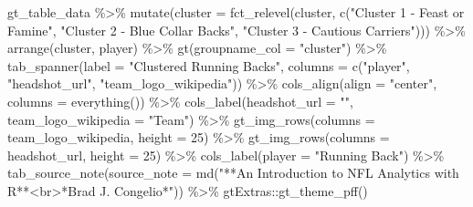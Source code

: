 \documentclass[
  letterpaper,
]{krantz}
\newenvironment{Shaded}{\begin{snugshade}}{\end{snugshade}}
\newcommand{\AttributeTok}[1]{\textcolor[rgb]{0.40,0.45,0.13}{#1}}
\newcommand{\DecValTok}[1]{\textcolor[rgb]{0.68,0.00,0.00}{#1}}
\newcommand{\FunctionTok}[1]{\textcolor[rgb]{0.28,0.35,0.67}{#1}}
\newcommand{\NormalTok}[1]{\textcolor[rgb]{0.00,0.23,0.31}{#1}}
\newcommand{\SpecialCharTok}[1]{\textcolor[rgb]{0.37,0.37,0.37}{#1}}
\newcommand{\StringTok}[1]{\textcolor[rgb]{0.13,0.47,0.30}{#1}}
\begin{document}
\begin{Shaded}
\begin{Highlighting}[]
\NormalTok{gt\_table\_data }\SpecialCharTok{\%\textgreater{}\%}
  \FunctionTok{mutate}\NormalTok{(}\AttributeTok{cluster =} \FunctionTok{fct\_relevel}\NormalTok{(cluster,}
                               \FunctionTok{c}\NormalTok{(}\StringTok{"Cluster 1 {-} Feast or Famine"}\NormalTok{,}
                                 \StringTok{"Cluster 2 {-} Blue Collar Backs"}\NormalTok{,}
                                 \StringTok{"Cluster 3 {-} Cautious Carriers"}\NormalTok{))) }\SpecialCharTok{\%\textgreater{}\%}
  \FunctionTok{arrange}\NormalTok{(cluster, player) }\SpecialCharTok{\%\textgreater{}\%}
  \FunctionTok{gt}\NormalTok{(}\AttributeTok{groupname\_col =} \StringTok{"cluster"}\NormalTok{) }\SpecialCharTok{\%\textgreater{}\%}
  \FunctionTok{tab\_spanner}\NormalTok{(}\AttributeTok{label =} \StringTok{"Clustered Running Backs"}\NormalTok{,}
              \AttributeTok{columns =} \FunctionTok{c}\NormalTok{(}\StringTok{"player"}\NormalTok{, }\StringTok{"headshot\_url"}\NormalTok{,}
                          \StringTok{"team\_logo\_wikipedia"}\NormalTok{)) }\SpecialCharTok{\%\textgreater{}\%}
  \FunctionTok{cols\_align}\NormalTok{(}\AttributeTok{align =} \StringTok{"center"}\NormalTok{,}
             \AttributeTok{columns =} \FunctionTok{everything}\NormalTok{()) }\SpecialCharTok{\%\textgreater{}\%}
  \FunctionTok{cols\_label}\NormalTok{(}\AttributeTok{headshot\_url =} \StringTok{""}\NormalTok{, }\AttributeTok{team\_logo\_wikipedia =} \StringTok{"Team"}\NormalTok{) }\SpecialCharTok{\%\textgreater{}\%}
  \FunctionTok{gt\_img\_rows}\NormalTok{(}\AttributeTok{columns =}\NormalTok{ team\_logo\_wikipedia, }\AttributeTok{height =} \DecValTok{25}\NormalTok{) }\SpecialCharTok{\%\textgreater{}\%}
  \FunctionTok{gt\_img\_rows}\NormalTok{(}\AttributeTok{columns =}\NormalTok{ headshot\_url, }\AttributeTok{height =} \DecValTok{25}\NormalTok{) }\SpecialCharTok{\%\textgreater{}\%}
  \FunctionTok{cols\_label}\NormalTok{(}\AttributeTok{player =} \StringTok{"Running Back"}\NormalTok{) }\SpecialCharTok{\%\textgreater{}\%}
  \FunctionTok{tab\_source\_note}\NormalTok{(}\AttributeTok{source\_note =}
                    \FunctionTok{md}\NormalTok{(}\StringTok{"**An Introduction to NFL Analytics with R**\textless{}br\textgreater{}*Brad J. Congelio*"}\NormalTok{)) }\SpecialCharTok{\%\textgreater{}\%}
\NormalTok{  gtExtras}\SpecialCharTok{::}\FunctionTok{gt\_theme\_pff}\NormalTok{()}
\end{Highlighting}
\end{Shaded}
\end{document}
